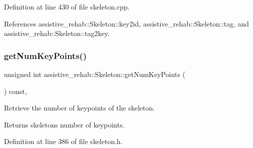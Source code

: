 Definition at line 430 of file skeleton.\+cpp.


\begin{DoxyCode}{0}

\end{DoxyCode}


References assistive\+\_\+rehab\+::\+Skeleton\+::key2id, assistive\+\_\+rehab\+::\+Skeleton\+::tag, and assistive\+\_\+rehab\+::\+Skeleton\+::tag2key.

\mbox{\label{classassistive__rehab_1_1Skeleton_ac5e5b98f2c9178f6e0def5033e27922f}} 
\subsubsection{\texorpdfstring{getNumKeyPoints()}{getNumKeyPoints()}}
{\footnotesize\ttfamily unsigned int assistive\+\_\+rehab\+::\+Skeleton\+::get\+Num\+Key\+Points (\begin{DoxyParamCaption}{ }\end{DoxyParamCaption}) const\hspace{0.3cm}{\ttfamily [inline]}, {\ttfamily [inherited]}}



Retrieve the number of keypoints of the skeleton. 

\begin{DoxyReturn}{Returns}
skeleton\textquotesingle{}s number of keypoints. 
\end{DoxyReturn}


Definition at line 386 of file skeleton.\+h.


\begin{DoxyCode}{0}

\end{DoxyCode}


